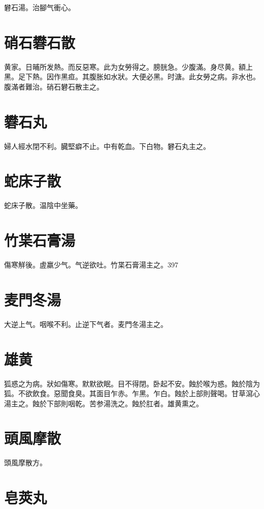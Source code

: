 \documentclass[12pt,twoside,UTF8,b5paper]{ctexbook}
\begin{document}
礬石湯。治腳气衝心。

\section{硝石礬石散}

黄家。日晡所发熱。而反惡寒。此为女勞得之。膀胱急。少腹滿。身尽黄。額上黑。足下熱。因作黑疸。其腹胀如水狀。大便必黑。时溏。此女勞之病。非水也。腹滿者難治。硝石礬石散主之。

\section{礬石丸}

婦人經水閉不利。臓堅癖不止。中有乾血。下白物。礬石丸主之。

\section{蛇床子散}

蛇床子散。温陰中坐藥。

\section{竹枼石膏湯}

傷寒觧後。虗羸少气。气逆欲吐。竹枼石膏湯主之。397

\section{麦門冬湯}

大逆上气。咽喉不利。止逆下气者。麦門冬湯主之。

\section{雄黄}

狐惑之为病。狀如傷寒。默默欲眠。目不得閉。卧起不安。蝕於喉为惑。蝕於陰为狐。不欲飲食。惡聞食臭。其面目乍赤。乍黑。乍白。蝕於上部則聲喝。甘草瀉心湯主之。蝕於下部則咽乾。苦参湯洗之。蝕於肛者。雄黄熏之。

\section{頭風摩散}

頭風摩散方。

\section{皂莢丸}
\end{document}
